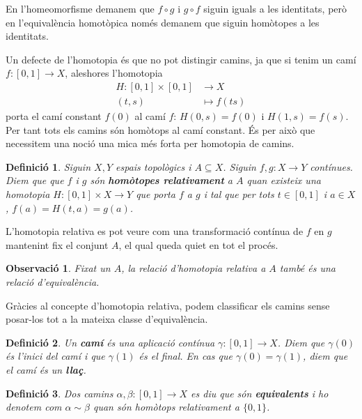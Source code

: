 \documentclass{article}
\newtheorem{definicio}{Definici\'{o}}
\newtheorem{observacio}{Observaci\'{o}}
\theoremstyle{definition}
\begin{document}
En l'homeomorfisme demanem que $f\circ g$ i $g\circ f$ siguin iguals a les identitats, per\`{o} en l'equival\`{e}ncia homot\`{o}pica nom\'{e}s demanem que siguin hom\`{o}topes a les identitats.

Un defecte de l'homotopia \'{e}s que no pot distingir camins, ja que si tenim un cam\'{i} $f:[0,1]\rightarrow X$, aleshores l'homotopia
\begin{align*}
H:[0,1]\times[0,1]&\longrightarrow X\\
(t,s)&\longmapsto f(ts)
\end{align*}
porta el cam\'{i} constant $f(0)$ al cam\'{i} $f$: $H(0,s)=f(0)$ i $H(1,s)=f(s)$. Per tant tots els camins s\'{o}n hom\`{o}tops al cam\'{i} constant. \'{E}s per aix\`{o} que necessitem una noci\'{o} una mica m\'{e}s forta per homotopia de camins.

\begin{definicio}
Siguin $X,Y$ espais topol\`{o}gics i $A\subseteq X$. Siguin $f,g:X\rightarrow Y$ cont\'{i}nues. Diem que que $f$ i $g$ s\'{o}n \textbf{hom\`{o}topes relativament} a $A$ quan existeix una homotopia $H:[0,1]\times X\rightarrow Y$ que porta $f$ a $g$ i tal que per tots $t\in[0,1]$ i $a\in X$, $f(a)=H(t,a)=g(a)$.
\end{definicio}

L'homotopia relativa es pot veure com una transformaci\'{o} cont\'{i}nua de $f$ en $g$ mantenint fix el conjunt $A$, el qual queda quiet en tot el proc\'{e}s.

\begin{observacio}
Fixat un $A$, la relaci\'{o} d'homotopia relativa a $A$ tamb\'{e} \'{e}s una relaci\'{o} d'equival\`{e}ncia.
\end{observacio}

Gr\`{a}cies al concepte d'homotopia relativa, podem classificar els camins sense posar-los tot a la mateixa classe d'equival\`{e}ncia.

\begin{definicio}
Un \textbf{cam\'{i}} \'{e}s una aplicaci\'{o} cont\'{i}nua $\gamma:[0,1]\rightarrow X$. Diem que $\gamma(0)$ \'{e}s l'inici del cam\'{i} i que $\gamma(1)$ \'{e}s el final. En cas que $\gamma(0)=\gamma(1)$, diem que el cam\'{i} \'{e}s un \textbf{lla\c{c}}.
\end{definicio}

\begin{definicio}
Dos camins $\alpha,\beta:[0,1]\rightarrow X$ es diu que s\'{o}n \textbf{equivalents} i ho denotem com $\alpha\sim\beta$ quan s\'{o}n hom\`{o}tops relativament a $\{0,1\}$. 
\end{definicio}
\end{document}
